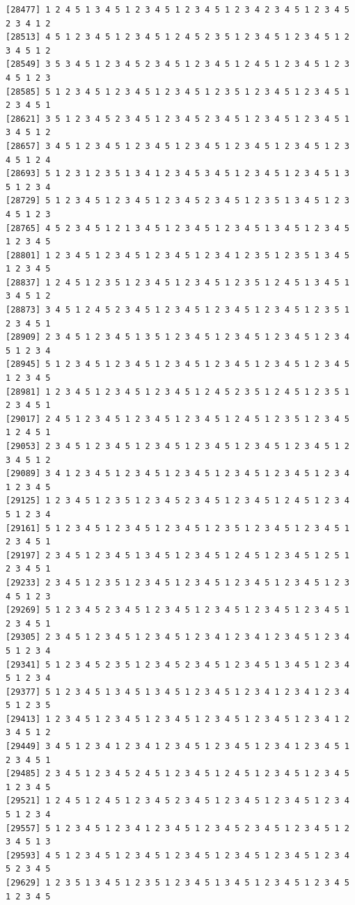 \documentclass[
  11pt,
]{book}
\begin{document}
\begin{verbatim}
[28477] 1 2 4 5 1 3 4 5 1 2 3 4 5 1 2 3 4 5 1 2 3 4 2 3 4 5 1 2 3 4 5 2 3 4 1 2
[28513] 4 5 1 2 3 4 5 1 2 3 4 5 1 2 4 5 2 3 5 1 2 3 4 5 1 2 3 4 5 1 2 3 4 5 1 2
[28549] 3 5 3 4 5 1 2 3 4 5 2 3 4 5 1 2 3 4 5 1 2 4 5 1 2 3 4 5 1 2 3 4 5 1 2 3
[28585] 5 1 2 3 4 5 1 2 3 4 5 1 2 3 4 5 1 2 3 5 1 2 3 4 5 1 2 3 4 5 1 2 3 4 5 1
[28621] 3 5 1 2 3 4 5 2 3 4 5 1 2 3 4 5 2 3 4 5 1 2 3 4 5 1 2 3 4 5 1 3 4 5 1 2
[28657] 3 4 5 1 2 3 4 5 1 2 3 4 5 1 2 3 4 5 1 2 3 4 5 1 2 3 4 5 1 2 3 4 5 1 2 4
[28693] 5 1 2 3 1 2 3 5 1 3 4 1 2 3 4 5 3 4 5 1 2 3 4 5 1 2 3 4 5 1 3 5 1 2 3 4
[28729] 5 1 2 3 4 5 1 2 3 4 5 1 2 3 4 5 2 3 4 5 1 2 3 5 1 3 4 5 1 2 3 4 5 1 2 3
[28765] 4 5 2 3 4 5 1 2 1 3 4 5 1 2 3 4 5 1 2 3 4 5 1 3 4 5 1 2 3 4 5 1 2 3 4 5
[28801] 1 2 3 4 5 1 2 3 4 5 1 2 3 4 5 1 2 3 4 1 2 3 5 1 2 3 5 1 3 4 5 1 2 3 4 5
[28837] 1 2 4 5 1 2 3 5 1 2 3 4 5 1 2 3 4 5 1 2 3 5 1 2 4 5 1 3 4 5 1 3 4 5 1 2
[28873] 3 4 5 1 2 4 5 2 3 4 5 1 2 3 4 5 1 2 3 4 5 1 2 3 4 5 1 2 3 5 1 2 3 4 5 1
[28909] 2 3 4 5 1 2 3 4 5 1 3 5 1 2 3 4 5 1 2 3 4 5 1 2 3 4 5 1 2 3 4 5 1 2 3 4
[28945] 5 1 2 3 4 5 1 2 3 4 5 1 2 3 4 5 1 2 3 4 5 1 2 3 4 5 1 2 3 4 5 1 2 3 4 5
[28981] 1 2 3 4 5 1 2 3 4 5 1 2 3 4 5 1 2 4 5 2 3 5 1 2 4 5 1 2 3 5 1 2 3 4 5 1
[29017] 2 4 5 1 2 3 4 5 1 2 3 4 5 1 2 3 4 5 1 2 4 5 1 2 3 5 1 2 3 4 5 1 2 4 5 1
[29053] 2 3 4 5 1 2 3 4 5 1 2 3 4 5 1 2 3 4 5 1 2 3 4 5 1 2 3 4 5 1 2 3 4 5 1 2
[29089] 3 4 1 2 3 4 5 1 2 3 4 5 1 2 3 4 5 1 2 3 4 5 1 2 3 4 5 1 2 3 4 1 2 3 4 5
[29125] 1 2 3 4 5 1 2 3 5 1 2 3 4 5 2 3 4 5 1 2 3 4 5 1 2 4 5 1 2 3 4 5 1 2 3 4
[29161] 5 1 2 3 4 5 1 2 3 4 5 1 2 3 4 5 1 2 3 5 1 2 3 4 5 1 2 3 4 5 1 2 3 4 5 1
[29197] 2 3 4 5 1 2 3 4 5 1 3 4 5 1 2 3 4 5 1 2 4 5 1 2 3 4 5 1 2 5 1 2 3 4 5 1
[29233] 2 3 4 5 1 2 3 5 1 2 3 4 5 1 2 3 4 5 1 2 3 4 5 1 2 3 4 5 1 2 3 4 5 1 2 3
[29269] 5 1 2 3 4 5 2 3 4 5 1 2 3 4 5 1 2 3 4 5 1 2 3 4 5 1 2 3 4 5 1 2 3 4 5 1
[29305] 2 3 4 5 1 2 3 4 5 1 2 3 4 5 1 2 3 4 1 2 3 4 1 2 3 4 5 1 2 3 4 5 1 2 3 4
[29341] 5 1 2 3 4 5 2 3 5 1 2 3 4 5 2 3 4 5 1 2 3 4 5 1 3 4 5 1 2 3 4 5 1 2 3 4
[29377] 5 1 2 3 4 5 1 3 4 5 1 3 4 5 1 2 3 4 5 1 2 3 4 1 2 3 4 1 2 3 4 5 1 2 3 5
[29413] 1 2 3 4 5 1 2 3 4 5 1 2 3 4 5 1 2 3 4 5 1 2 3 4 5 1 2 3 4 1 2 3 4 5 1 2
[29449] 3 4 5 1 2 3 4 1 2 3 4 1 2 3 4 5 1 2 3 4 5 1 2 3 4 1 2 3 4 5 1 2 3 4 5 1
[29485] 2 3 4 5 1 2 3 4 5 2 4 5 1 2 3 4 5 1 2 4 5 1 2 3 4 5 1 2 3 4 5 1 2 3 4 5
[29521] 1 2 4 5 1 2 4 5 1 2 3 4 5 2 3 4 5 1 2 3 4 5 1 2 3 4 5 1 2 3 4 5 1 2 3 4
[29557] 5 1 2 3 4 5 1 2 3 4 1 2 3 4 5 1 2 3 4 5 2 3 4 5 1 2 3 4 5 1 2 3 4 5 1 3
[29593] 4 5 1 2 3 4 5 1 2 3 4 5 1 2 3 4 5 1 2 3 4 5 1 2 3 4 5 1 2 3 4 5 2 3 4 5
[29629] 1 2 3 5 1 3 4 5 1 2 3 5 1 2 3 4 5 1 3 4 5 1 2 3 4 5 1 2 3 4 5 1 2 3 4 5

\end{verbatim}
\end{document}
